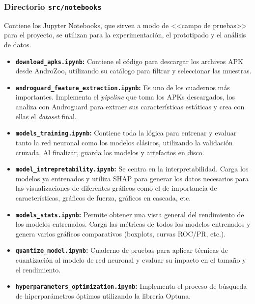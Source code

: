 \subsubsection{Directorio \texttt{src/notebooks}}
Contiene los Jupyter Notebooks, que sirven a modo de <<campo de pruebas>> para el proyecto, se utilizan para la experimentación, el prototipado y el análisis de datos.

\newpage


\begin{itemize}
	\item \textbf{\texttt{download\_apks.ipynb}:} Contiene el código para descargar los archivos APK desde AndroZoo, utilizando su catálogo para filtrar y seleccionar las muestras.
	
	\item \textbf{\texttt{androguard\_feature\_extraction.ipynb}:} Es uno de los cuadernos más importantes. Implementa el \textit{pipeline} que toma los APKs descargados, los analiza con Androguard para extraer sus características estáticas y crea con ellas el \textit{dataset} final.
	
	\item \textbf{\texttt{models\_training.ipynb}:} Contiene toda la lógica para entrenar y evaluar tanto la red neuronal como los modelos clásicos, utilizando la validación cruzada. Al finalizar, guarda los modelos y artefactos en disco.
	
	\item \textbf{\texttt{model\_intrepretability.ipynb}:} Se centra en la interpretabilidad. Carga los modelos ya entrenados y utiliza SHAP para generar los datos necesarios para las visualizaciones de diferentes gráficos como el de importancia de características, gráficos de fuerza, gráficos en cascada, etc.
	
	\item \textbf{\texttt{models\_stats.ipynb}:} Permite obtener una vista general del rendimiento de los modelos entrenados. Carga las métricas de todos los modelos entrenados y genera varios gráficos comparativos (boxplots, curvas ROC/PR, etc.).
	
	\item \textbf{\texttt{quantize\_model.ipynb}:} Cuaderno de pruebas para aplicar técnicas de cuantización al modelo de red neuronal y evaluar su impacto en el tamaño y el rendimiento.
	
	\item \textbf{\texttt{hyperparameters\_optimization.ipynb}:} Implementa el proceso de búsqueda de hiperparámetros óptimos utilizando la librería Optuna.
\end{itemize}


